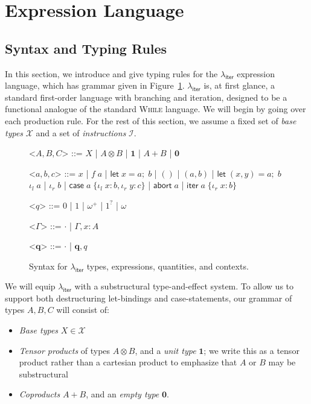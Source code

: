 \documentclass[acmsmall,screen,review]{acmart}
\newcommand{\mc}[1]{\ensuremath{\mathcal{#1}}}
\newcommand{\mb}[1]{\ensuremath{\mathbf{#1}}}
\newcommand{\ms}[1]{\ensuremath{\mathsf{#1}}}
\newcommand{\lto}{:}
\newcommand{\linl}[1]{\iota_l\;{#1}}
\newcommand{\linr}[1]{\iota_r\;{#1}}
\newcommand{\labort}[1]{\ms{abort}\;{#1}}
\newcommand{\letexpr}[3]{\ensuremath{\ms{let}\;#1 = #2;\;#3}}
\newcommand{\caseexpr}[5]{\ms{case}\;#1\;\{\linl{#2} \lto #3, \linr{#4} \lto #5\}}
\newcommand{\liter}[3]{\ms{iter}\;#1\;\{ \linr{#2} \lto #3 \}}
\newcommand{\subiterexp}{\texorpdfstring{\(\lambda_{\ms{iter}}\)}{lambda-iter}}
\newcommand{\zeroq}{0}
\newcommand{\oneq}{1}
\newcommand{\delq}{1^?}
\newcommand{\cpyq}{\omega^+}
\newcommand{\topq}{\omega}
\begin{document}
\section{Expression Language}

\subsection{Syntax and Typing Rules}

In this section, we introduce and give typing rules for the \subiterexp{} expression language, which
has grammar given in Figure~\ref{fig:expr-syntax}. \subiterexp{} is, at first glance, a
standard first-order language with branching and iteration, designed to be a functional analogue of
the standard \textsc{While} language. We will begin by going over each production rule. For the rest
of this section, we assume a fixed set of \emph{base types} $\mc{X}$ and a set of
\emph{instructions} $\mc{I}$. 

\begin{figure}
  \begin{grammar}
    <\(A, B, C\)> ::= 
    \(X\)
    \;|\; \(A \otimes B\)
    \;|\; \(\mathbf{1}\)
    \;|\; \(A + B\)
    \;|\; \(\mathbf{0}\)

    <\(a, b, c\)> ::=
    \(x\)
    \;|\; \(f\;a\)
    \;|\; \(\letexpr{x}{a}{b}\)
    \;|\; \(()\)
    \;|\; \((a, b)\)
    \;|\; \(\letexpr{(x, y)}{a}{b}\)
    \alt  \(\linl{a}\)
    \;|\; \(\linr{b}\)
    \;|\; \(\caseexpr{a}{x}{b}{y}{c}\)
    \;|\; \(\labort{a}\)
    \;|\; \(\liter{a}{x}{b}\)
    
    <\(q\)> ::= \(\zeroq\) | \(\oneq\) | \(\cpyq\) | \(\delq\) | \(\topq\)

    <\(\Gamma\)> ::= \(\cdot\) \;|\; \(\Gamma, x : A\)

    <\(\mb{q}\)> ::= \(\cdot\) \;|\; \(\mb{q}, q\)
  \end{grammar}
  \caption{Syntax for \subiterexp{} types, expressions, quantities, and contexts.} \Description{}
  \label{fig:expr-syntax}
\end{figure}

We will equip \subiterexp{} with a substructural type-and-effect system. To allow us to support both
destructuring let-bindings and case-statements, our grammar of types $A, B, C$ will consist of:
\begin{itemize}
  \item \emph{Base types} $X \in \mc{X}$
  \item \emph{Tensor products} of types $A \otimes B$, and a \emph{unit type} $\mb{1}$; we write
  this as a tensor product rather than a cartesian product to emphasize that $A$ or $B$ may be
  substructural
  \item \emph{Coproducts} $A + B$, and an \emph{empty type} $\mb{0}$.
\end{itemize}
\end{document}
